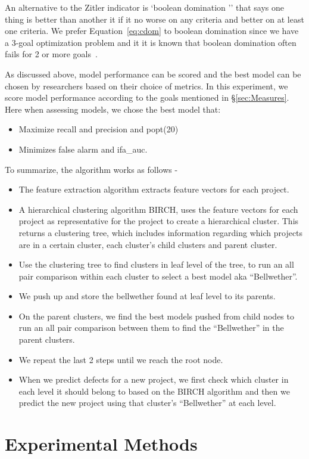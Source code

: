\documentclass[10pt,journal,compsoc]{IEEEtran}
\newcommand{\bi}{\begin{itemize}}
\newcommand{\ei}{\end{itemize}}
\newcommand{\respto}[1]{
\fcolorbox{black}{black!15}{%
\label{resp:#1}%
\bf\scriptsize R{#1}}}
\begin{document}
An alternative to the Zitler indicator is    `boolean domination '' that says one thing is better than another it if it no worse on any criteria and better on at least one criteria. We prefer Equation~\ref{eq:cdom} to boolean domination since we have a   3-goal optimization problem and it it is known that boolean domination often  fails for 2 or more goals~\cite{Wagner:2007,Sayyad:2013}. 
 
{\color{blue}\respto{1-5g} As discussed above, model performance can be scored and the best model can be chosen by researchers based on their choice of metrics. In this experiment, we score model performance according to the goals mentioned in \S\ref{sec:Measures}. Here when assessing models, we  chose the best model that:}

\bi
\item
{\color{blue}Maximize
recall and precision and popt(20)}
\item {\color{blue} Minimizes false alarm and ifa\_auc.}
\ei


{\color{blue}
\noindent
To summarize, the algorithm works as follows -
\bi
\item The feature extraction algorithm extracts feature vectors for each project.
\item A hierarchical clustering algorithm BIRCH, uses the feature vectors for each project as representative for the project to create a hierarchical cluster. This returns a clustering tree, which includes information regarding which projects are in a certain cluster, each cluster's child clusters and parent cluster.
\item Use the clustering tree to find clusters in leaf level of the tree, to run an all pair comparison within each cluster to select a best model aka ``Bellwether''. 
\item We push up and store the bellwether found at leaf level to its parents.
\item On the parent clusters, we find the best models pushed from child nodes to run an all pair comparison between them to find the ``Bellwether'' in the parent clusters.
\item We repeat the last 2 steps until we reach the root node.
\item When we predict defects for a new project, we first check which cluster in each level it should belong to based on the BIRCH algorithm and then we predict the new project using that cluster's ``Bellwether'' at each level.
\ei
}

\section{Experimental Methods}
\label{sec:Data Collection}
\end{document}
